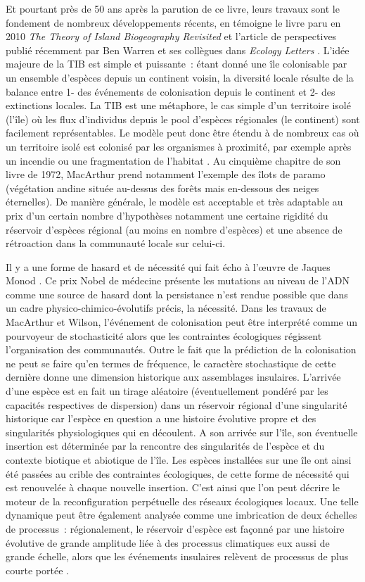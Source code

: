 Et pourtant près de 50 ans après la parution de ce livre, leurs travaux
sont le fondement de nombreux développements récents, en témoigne le
livre paru en 2010 \emph{The Theory of Island Biogeography Revisited}
\citep{Losos2010} et l'article de perspectives publié récemment par Ben
Warren et ses collègues dans \emph{Ecology Letters} \citep{Warren2015}.
L'idée majeure de la TIB est simple et puissante~: étant donné une île
colonisable par un ensemble d'espèces depuis un continent voisin, la
diversité locale résulte de la balance entre 1- des événements de
colonisation depuis le continent et 2- des extinctions locales. La TIB
est une métaphore, le cas simple d'un territoire isolé (l'île) où les
flux d'individus depuis le pool d'espèces régionales (le continent) sont
facilement représentables. Le modèle peut donc être étendu à de nombreux
cas où un territoire isolé est colonisé par les organismes à proximité,
par exemple après un incendie ou une fragmentation de l'habitat
\citep{Cook2002}. Au cinquième chapitre de son livre de 1972, MacArthur
prend notamment l'exemple des îlots de paramo (végétation andine située
au-dessus des forêts mais en-dessous des neiges éternelles). De manière
générale, le modèle est acceptable et très adaptable au prix d'un
certain nombre d'hypothèses notamment une certaine rigidité du réservoir
d'espèces régional (au moins en nombre d'espèces) et une absence de
rétroaction dans la communauté locale sur celui-ci.

Il y a une forme de hasard et de nécessité qui fait écho à l'œuvre de
Jaques Monod \citep{monod1970hasard}. Ce prix Nobel de médecine présente
les mutations au niveau de l'ADN comme une source de hasard dont la
persistance n'est rendue possible que dans un cadre
physico-chimico-évolutifs précis, la nécessité. Dans les travaux de
MacArthur et Wilson, l'événement de colonisation peut être interprété
comme un pourvoyeur de stochasticité alors que les contraintes
écologiques régissent l'organisation des communautés. Outre le fait que
la prédiction de la colonisation ne peut se faire qu'en termes de
fréquence, le caractère stochastique de cette dernière donne une
dimension historique aux assemblages insulaires. L'arrivée d'une espèce
est en fait un tirage aléatoire (éventuellement pondéré par les
capacités respectives de dispersion) dans un réservoir régional d'une
singularité historique car l'espèce en question a une histoire évolutive
propre et des singularités physiologiques qui en découlent. A son
arrivée sur l'île, son éventuelle insertion est déterminée par la
rencontre des singularités de l'espèce et du contexte biotique et
abiotique de l'île. Les espèces installées sur une île ont ainsi été
passées au crible des contraintes écologiques, de cette forme de
nécessité qui est renouvelée à chaque nouvelle insertion. C'est ainsi
que l'on peut décrire le moteur de la reconfiguration perpétuelle des
réseaux écologiques locaux. Une telle dynamique peut être également
analysée comme une imbrication de deux échelles de processus~:
régionalement, le réservoir d'espèce est façonné par une histoire
évolutive de grande amplitude liée à des processus climatiques eux aussi
de grande échelle, alors que les événements insulaires relèvent de
processus de plus courte portée \citep{Ricklefs1987}.

